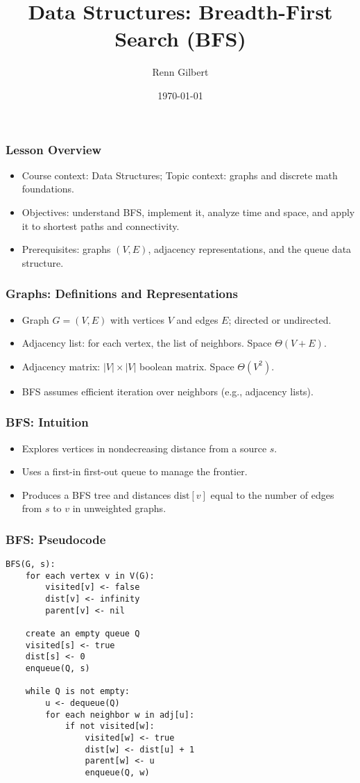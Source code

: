 \documentclass{beamer}
\title{Data Structures: Breadth-First Search (BFS)}
\author{Renn Gilbert}
\date{\today}
\begin{document}
\begin{frame}
\titlepage
\end{frame}

\begin{frame}
\frametitle{Lesson Overview}
\begin{itemize}
    \item Course context: Data Structures; Topic context: graphs and discrete math foundations.
    \item Objectives: understand BFS, implement it, analyze time and space, and apply it to shortest paths and connectivity.
    \item Prerequisites: graphs $(V,E)$, adjacency representations, and the queue data structure.
\end{itemize}
\end{frame}

\begin{frame}
\frametitle{Graphs: Definitions and Representations}
\begin{itemize}
    \item Graph $G=(V,E)$ with vertices $V$ and edges $E$; directed or undirected.
    \item Adjacency list: for each vertex, the list of neighbors. Space $\Theta(V+E)$.
    \item Adjacency matrix: $|V|\times|V|$ boolean matrix. Space $\Theta(V^2)$.
    \item BFS assumes efficient iteration over neighbors (e.g., adjacency lists).
\end{itemize}
\end{frame}

\begin{frame}
\frametitle{BFS: Intuition}
\begin{itemize}
    \item Explores vertices in nondecreasing distance from a source $s$.
    \item Uses a first-in first-out queue to manage the frontier.
    \item Produces a BFS tree and distances $\text{dist}[v]$ equal to the number of edges from $s$ to $v$ in unweighted graphs.
\end{itemize}
\end{frame}

\begin{frame}[fragile]
\frametitle{BFS: Pseudocode}
\begin{lstlisting}[language={},escapechar=!]
BFS(G, s):
    for each vertex v in V(G):
        visited[v] <- false
        dist[v] <- infinity
        parent[v] <- nil

    create an empty queue Q
    visited[s] <- true
    dist[s] <- 0
    enqueue(Q, s)

    while Q is not empty:
        u <- dequeue(Q)
        for each neighbor w in adj[u]:
            if not visited[w]:
                visited[w] <- true
                dist[w] <- dist[u] + 1
                parent[w] <- u
                enqueue(Q, w)
\end{lstlisting}
\end{frame}
\end{document}
